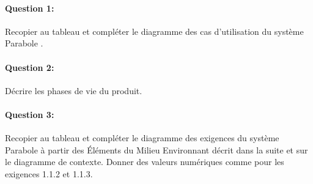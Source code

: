 \paragraph{Question 1:} Recopier au tableau et compléter le diagramme des cas d'utilisation du système \og Parabole \fg.

\begin{center}
\end{center}

\paragraph{Question 2:} Décrire les phases de vie du produit.

\newpage

\paragraph{Question 3:} Recopier au tableau et compléter le diagramme des exigences du système \og Parabole \fg à partir des Éléments du Milieu Environnant décrit dans la suite et sur le diagramme de contexte. Donner des valeurs numériques comme pour les exigences 1.1.2 et 1.1.3.

\begin{center}
\end{center}

